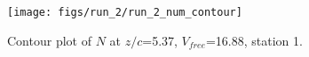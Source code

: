 \begin{figure}[H]
\centering
\texttt{[image: figs/run\_2/run\_2\_num\_contour]}
\caption{Contour plot of $N$ at $z/c$=5.37, $V_{free}$=16.88, station 1.}
\label{fig:run_2_num_contour}
\end{figure}


